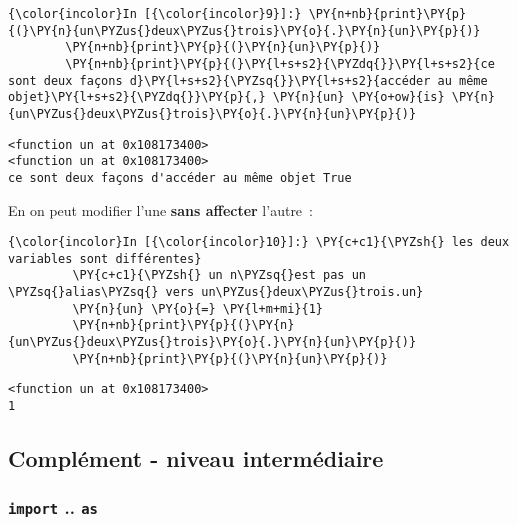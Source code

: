     \begin{Verbatim}[commandchars=\\\{\}]
{\color{incolor}In [{\color{incolor}9}]:} \PY{n+nb}{print}\PY{p}{(}\PY{n}{un\PYZus{}deux\PYZus{}trois}\PY{o}{.}\PY{n}{un}\PY{p}{)}
        \PY{n+nb}{print}\PY{p}{(}\PY{n}{un}\PY{p}{)}
        \PY{n+nb}{print}\PY{p}{(}\PY{l+s+s2}{\PYZdq{}}\PY{l+s+s2}{ce sont deux façons d}\PY{l+s+s2}{\PYZsq{}}\PY{l+s+s2}{accéder au même objet}\PY{l+s+s2}{\PYZdq{}}\PY{p}{,} \PY{n}{un} \PY{o+ow}{is} \PY{n}{un\PYZus{}deux\PYZus{}trois}\PY{o}{.}\PY{n}{un}\PY{p}{)}
\end{Verbatim}


    \begin{Verbatim}[commandchars=\\\{\}]
<function un at 0x108173400>
<function un at 0x108173400>
ce sont deux façons d'accéder au même objet True

    \end{Verbatim}

    En on peut modifier l'une \textbf{sans affecter} l'autre~:

    \begin{Verbatim}[commandchars=\\\{\}]
{\color{incolor}In [{\color{incolor}10}]:} \PY{c+c1}{\PYZsh{} les deux variables sont différentes}
         \PY{c+c1}{\PYZsh{} un n\PYZsq{}est pas un \PYZsq{}alias\PYZsq{} vers un\PYZus{}deux\PYZus{}trois.un}
         \PY{n}{un} \PY{o}{=} \PY{l+m+mi}{1}
         \PY{n+nb}{print}\PY{p}{(}\PY{n}{un\PYZus{}deux\PYZus{}trois}\PY{o}{.}\PY{n}{un}\PY{p}{)}
         \PY{n+nb}{print}\PY{p}{(}\PY{n}{un}\PY{p}{)}
\end{Verbatim}


    \begin{Verbatim}[commandchars=\\\{\}]
<function un at 0x108173400>
1

    \end{Verbatim}

    \hypertarget{compluxe9ment---niveau-intermuxe9diaire}{%
\subsection{Complément - niveau
intermédiaire}\label{compluxe9ment---niveau-intermuxe9diaire}}

    \hypertarget{import-..-as}{%
\subsubsection{\texorpdfstring{\texttt{import} ..
\texttt{as}}{import .. as}}\label{import-..-as}}

